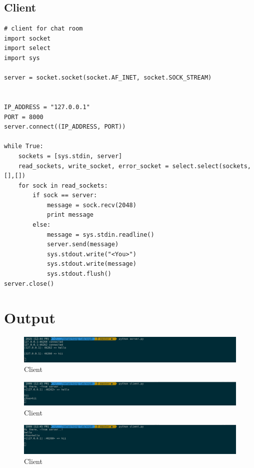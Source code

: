 \documentclass[a4paper,12pt]{article}
\begin{document}
\subsection{Client}

\begin{verbatim}
# client for chat room
import socket
import select
import sys

server = socket.socket(socket.AF_INET, socket.SOCK_STREAM)


IP_ADDRESS = "127.0.0.1"
PORT = 8000
server.connect((IP_ADDRESS, PORT))

while True:
    sockets = [sys.stdin, server]
    read_sockets, write_socket, error_socket = select.select(sockets,[],[])
    for sock in read_sockets:
        if sock == server:
            message = sock.recv(2048)
            print message
        else:
            message = sys.stdin.readline()
            server.send(message)
            sys.stdout.write("<You>")
            sys.stdout.write(message)
            sys.stdout.flush()
server.close()                    

\end{verbatim}
 
\section{Output}
\pagebreak

\begin{figure}
	\includegraphics[width=\linewidth]{./server-chat.png}
	\caption{Client}
	\label{fig:client}
\end{figure}

\begin{figure}
	\includegraphics[width=\linewidth]{./client-1.png}
	\caption{Client}
	\label{fig:client}
\end{figure}

\begin{figure}
	\includegraphics[width=\linewidth]{./client-2.png}
	\caption{Client}
	\label{fig:client}
\end{figure}
\end{document}
